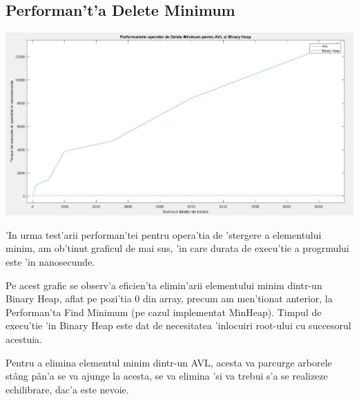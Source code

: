 \documentclass[titlepage,12pt]{article}
\numberwithin{figure}{section}
\begin{document}
\subsection{Performan't'a Delete Minimum}
\includegraphics[scale=0.5]{DMin}
\\ \par 'In urma test'arii performan'tei pentru opera'tia de 'stergere a elementului minim, am ob'tinut graficul de mai sus, 'in care durata de execu'tie a progrmului este 'in nanosecunde.
\par Pe acest grafic se observ'a eficien'ta elimin'arii elementului minim dintr-un Binary Heap, aflat pe pozi'tia 0 din array, precum am men'tionat anterior, la Performan'ta Find Minimum (pe cazul implementat MinHeap). Timpul de execu'tie 'in Binary Heap este dat de necesitatea 'inlocuiri root-ului cu succesorul acestuia. 
\par Pentru a elimina elementul minim dintr-un AVL, acesta va parcurge arborele st\^ang p\^an'a se va ajunge la acesta, se va elimina 'si va trebui s'a se realizeze echilibrare, dac'a este nevoie.
\end{document}
